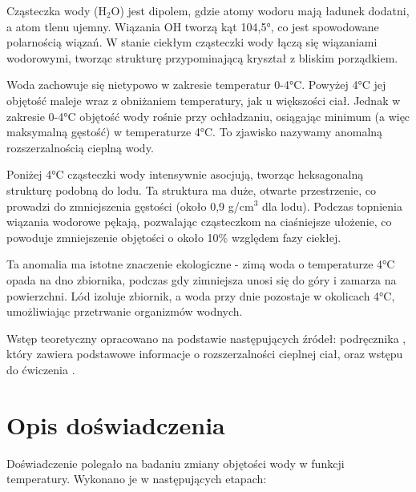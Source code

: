\documentclass[a4paper,12pt]{article}
\begin{document}
Cząsteczka wody (H$_2$O) jest dipolem, gdzie atomy wodoru mają ładunek dodatni, a atom tlenu ujemny. Wiązania OH tworzą kąt 104{,}5°, co jest spowodowane polarnością wiązań. W stanie ciekłym cząsteczki wody łączą się wiązaniami wodorowymi, tworząc strukturę przypominającą kryształ z bliskim porządkiem.

Woda zachowuje się nietypowo w zakresie temperatur 0-4°C. Powyżej 4°C jej objętość maleje wraz z obniżaniem temperatury, jak u większości ciał. Jednak w zakresie 0-4°C objętość wody rośnie przy ochładzaniu, osiągając minimum (a więc maksymalną gęstość) w temperaturze 4°C. To zjawisko nazywamy anomalną rozszerzalnością cieplną wody.

Poniżej 4°C cząsteczki wody intensywnie asocjują, tworząc heksagonalną strukturę podobną do lodu. Ta struktura ma duże, otwarte przestrzenie, co prowadzi do zmniejszenia gęstości (około 0,9 g/cm$^3$ dla lodu). Podczas topnienia wiązania wodorowe pękają, pozwalając cząsteczkom na ciaśniejsze ułożenie, co powoduje zmniejszenie objętości o około 10\% względem fazy ciekłej.

Ta anomalia ma istotne znaczenie ekologiczne - zimą woda o temperaturze 4°C opada na dno zbiornika, podczas gdy zimniejsza unosi się do góry i zamarza na powierzchni. Lód izoluje zbiornik, a woda przy dnie pozostaje w okolicach 4°C, umożliwiając przetrwanie organizmów wodnych.

Wstęp teoretyczny opracowano na podstawie następujących źródeł: podręcznika \cite{fizyka_dla_szkół_wyższych_tom_2}, który zawiera podstawowe informacje o rozszerzalności cieplnej ciał, oraz wstępu do ćwiczenia \cite{lab29manual}.

\section{Opis doświadczenia}

Doświadczenie polegało na badaniu zmiany objętości wody w funkcji temperatury. Wykonano je w następujących etapach:
\end{document}
